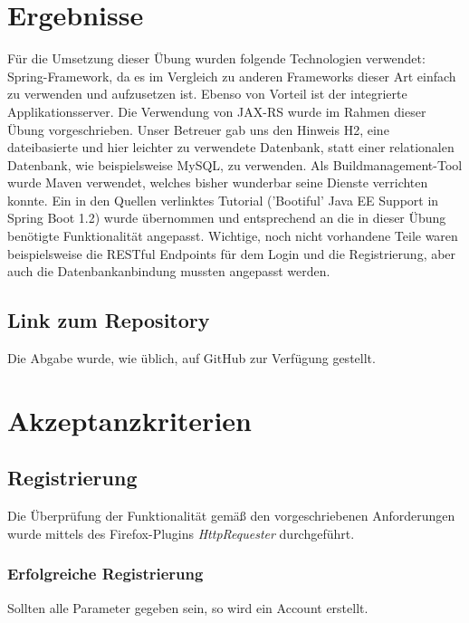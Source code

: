 
\section{Ergebnisse}
\label{sec:Ergebnisse}
Für die Umsetzung dieser Übung wurden folgende Technologien verwendet:
Spring-Framework, da es im Vergleich zu anderen Frameworks dieser Art einfach zu verwenden und aufzusetzen ist. Ebenso von Vorteil ist der integrierte Applikationsserver. Die Verwendung von JAX-RS wurde im Rahmen dieser Übung vorgeschrieben. Unser Betreuer gab uns den Hinweis H2, eine dateibasierte und hier leichter zu verwendete Datenbank, statt einer relationalen Datenbank, wie beispielsweise MySQL, zu verwenden. Als Buildmanagement-Tool wurde Maven verwendet, welches bisher wunderbar seine Dienste verrichten konnte. Ein in den Quellen verlinktes Tutorial ('Bootiful' Java EE Support in Spring Boot 1.2) wurde übernommen und entsprechend an die in dieser Übung benötigte Funktionalität angepasst. Wichtige, noch nicht vorhandene Teile waren beispielsweise die RESTful Endpoints für dem Login und die Registrierung, aber auch die Datenbankanbindung mussten angepasst werden. \cite{Bootiful, SpringFramework, JAXRS, Maven, H2}

\subsection{Link zum Repository}
\label{subsec:Link zum Repository}
Die Abgabe wurde, wie üblich, auf GitHub zur Verfügung gestellt. \cite{GitHub-Repo}
\newpage

\section{Akzeptanzkriterien}
\subsection{Registrierung}
Die Überprüfung der Funktionalität gemäß den vorgeschriebenen Anforderungen wurde mittels des Firefox-Plugins \textit{HttpRequester} durchgeführt. \cite{HTTPFirefox}

\subsubsection{Erfolgreiche Registrierung}

Sollten alle Parameter gegeben sein, so wird ein Account erstellt.

